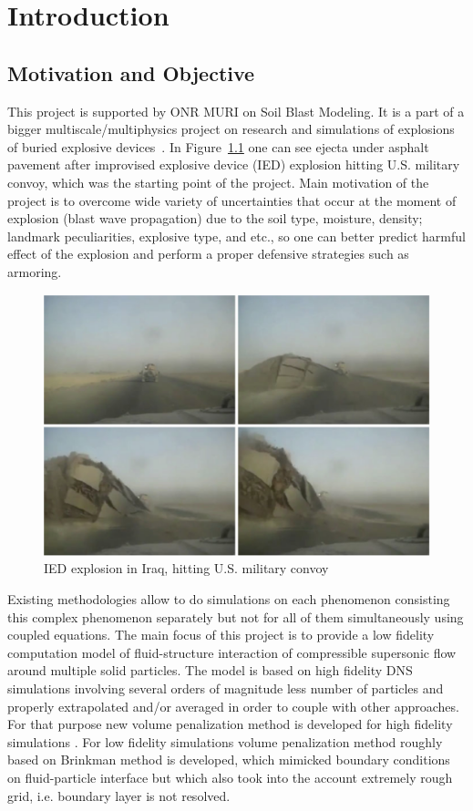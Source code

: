 \chapter{Introduction}
\label{chapter:1}

\section{Motivation and Objective}
This project is supported by ONR MURI on Soil Blast Modeling. It is a part of a bigger multiscale/multiphysics project on research and simulations of explosions of buried explosive devices~\cite{proc:muri}. In Figure~\ref{fig:muri_motiv} one can see ejecta under asphalt pavement after improvised explosive device (IED) explosion hitting U.S. military convoy, which was the starting point of the project. Main motivation of the project is to overcome wide variety of uncertainties that occur at the moment of explosion (blast wave propagation) due to the soil type, moisture, density; landmark peculiarities, explosive type, and etc., so one can better predict harmful effect of the explosion and perform a proper defensive strategies such as armoring.
\begin{figure}[h!]
\centering \includegraphics[scale=0.25]{fig/muri_motiv.png}
\caption{IED explosion in Iraq, hitting U.S. military convoy} \label{fig:muri_motiv}
\end{figure}

Existing methodologies allow to do simulations on each phenomenon consisting this complex phenomenon separately but not for all of them simultaneously using coupled equations. The main focus of this project is to provide a low fidelity computation model of fluid-structure interaction of compressible supersonic flow around multiple solid particles. The model is based on high fidelity DNS simulations involving several orders of magnitude less number of particles and properly extrapolated and/or averaged in order to couple with other approaches. For that purpose new volume penalization method is developed for high fidelity simulations \cite{ebd_nk_ovv_cbvp_jcp}. For low fidelity simulations volume penalization method roughly based on Brinkman method is developed, which mimicked boundary conditions on fluid-particle interface but which also took into the account extremely rough grid, i.e. boundary layer is not resolved.
